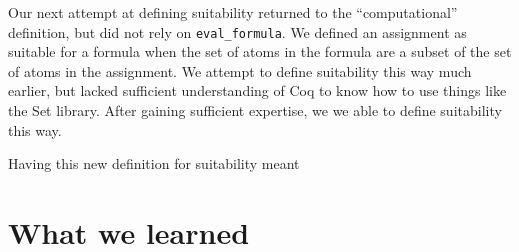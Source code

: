 \documentclass{article}
\begin{document}
Our next attempt at defining suitability returned to the ``computational'' definition, but did not rely on \verb|eval_formula|. We defined an assignment as suitable for a formula when the set of atoms in the formula are a subset of the set of atoms in the assignment. We attempt to define suitability this way much earlier, but lacked sufficient understanding of Coq to know how to use things like the Set library. After gaining sufficient expertise, we we able to define suitability this way. 

Having this new definition for suitability meant 



\section{What we learned}
\end{document}
